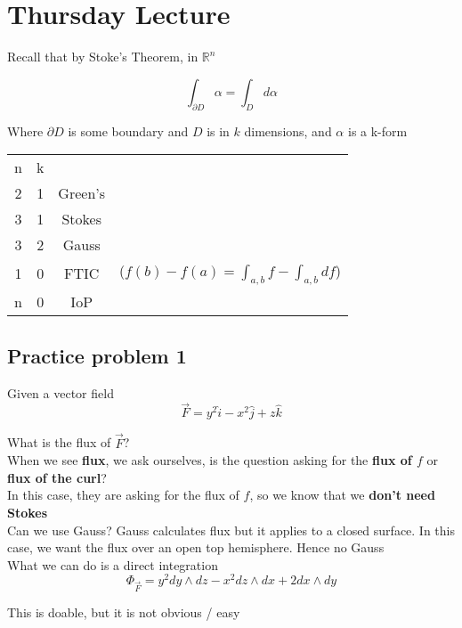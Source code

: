 \section{Thursday Lecture}


Recall that by Stoke's Theorem, in $\mathbb{R}^n$

\[
  \int_{\partial D}^{} \alpha = \int_{D}^{}  d \alpha 
\] 

Where $\partial D$ is some boundary and $D$ is in $k$ dimensions, and $\alpha$ is a k-form

\begin{center}
   \begin{tabular}{c c c c} 
      n & k & &\\
      2 & 1 & Green's&\\
      3 & 1 & Stokes&\\
      3 & 2 & Gauss&\\
      1 & 0 & FTIC &($f(b) - f(a) = \int_{{a, b}}^{} f - \int_{{a,b}}^{} df $)\\
      n & 0 & IoP& \\
   \end{tabular}
\end{center}


\subsection{Practice problem 1}

Given a vector field 
\[
  \vec{F} = y^2 \hat{i} - x^2 \hat{j} + z \hat{k}
\] 

What is the flux of $\vec{F}$? \\

When we see \textbf{flux}, we ask ourselves, is the question asking for the \textbf{flux of $f$} or \textbf{flux of the curl}? \\

In this case, they are asking for the flux of $f$, so we know that we \textbf{don't need Stokes} \\

Can we use Gauss? Gauss calculates flux but it applies to a closed surface. In this case, we want the flux over an open top hemisphere. Hence no Gauss \\

What we can do is a direct integration 
\[
   \Phi_{\vec{F}} = y^2 dy \wedge dz - x^2 dz \wedge dx + 2 dx \wedge dy
\] 

This is doable, but it is not obvious / easy  \\


